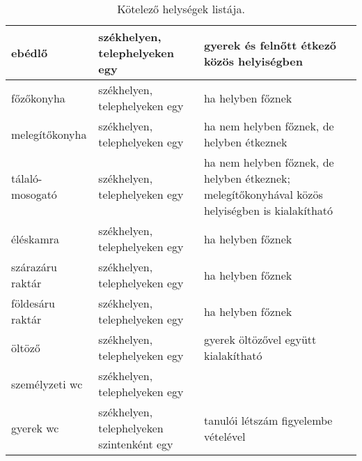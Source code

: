 \begin{table}[thb]
\begin{center}
\begin{tabular}{@{}p{4cm}|p{4cm}|p{6cm}@{}}
ebédlő                 & székhelyen, telephelyeken egy             & gyerek és felnőtt étkező közös helyiségben                                                      \\ \hline
főzőkonyha             & székhelyen, telephelyeken egy             & ha helyben főznek                                                                               \\ \hline
melegítőkonyha         & székhelyen, telephelyeken egy             & ha nem helyben főznek, de helyben étkeznek                                                      \\ \hline
tálaló-mosogató        & székhelyen, telephelyeken egy             & ha nem helyben főznek, de helyben étkeznek; melegítőkonyhával közös helyiségben is kialakítható \\ \hline
éléskamra              & székhelyen, telephelyeken egy             & ha helyben főznek                                                                               \\ \hline
szárazáru raktár       & székhelyen, telephelyeken egy             & ha helyben főznek                                                                               \\ \hline
földesáru raktár       & székhelyen, telephelyeken egy             & ha helyben főznek                                                                               \\ \hline
öltöző                 & székhelyen, telephelyeken egy             & gyerek öltözővel együtt kialakítható                                                            \\ \hline
személyzeti wc         & székhelyen, telephelyeken egy             &                                                                                                 \\ \hline
gyerek wc              & székhelyen, telephelyeken szintenként egy & tanulói létszám figyelembe vételével                                                            \\ 
\end{tabular}
\caption{Kötelező helységek listája.}
\label{tbl:helyisegek}
\end{center}
\end{table}

  